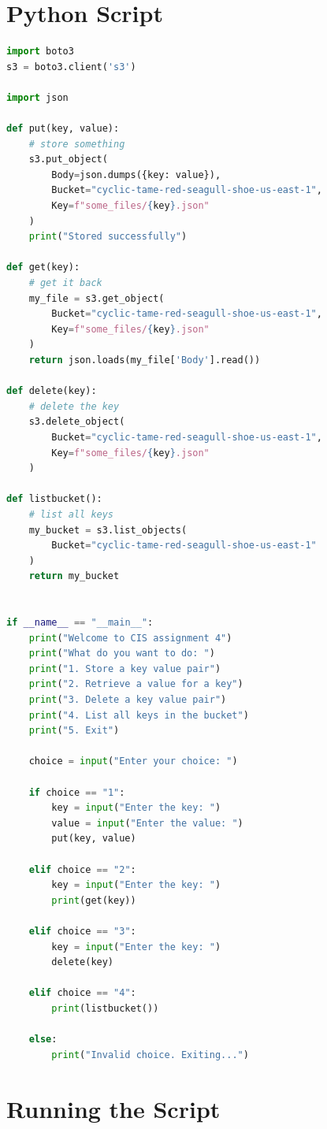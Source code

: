 \documentclass[11pt]{article}
\begin{document}
\section{Python Script}
\begin{lstlisting}[language=python]
import boto3
s3 = boto3.client('s3')

import json

def put(key, value):
    # store something
    s3.put_object(
        Body=json.dumps({key: value}),
        Bucket="cyclic-tame-red-seagull-shoe-us-east-1",
        Key=f"some_files/{key}.json"
    )
    print("Stored successfully")

def get(key):
    # get it back
    my_file = s3.get_object(
        Bucket="cyclic-tame-red-seagull-shoe-us-east-1",
        Key=f"some_files/{key}.json"
    )
    return json.loads(my_file['Body'].read())

def delete(key):
    # delete the key
    s3.delete_object(
        Bucket="cyclic-tame-red-seagull-shoe-us-east-1",
        Key=f"some_files/{key}.json"
    )

def listbucket():
    # list all keys
    my_bucket = s3.list_objects(
        Bucket="cyclic-tame-red-seagull-shoe-us-east-1"
    )
    return my_bucket


if __name__ == "__main__":
    print("Welcome to CIS assignment 4")
    print("What do you want to do: ")
    print("1. Store a key value pair")
    print("2. Retrieve a value for a key")
    print("3. Delete a key value pair")
    print("4. List all keys in the bucket")
    print("5. Exit")

    choice = input("Enter your choice: ")

    if choice == "1":
        key = input("Enter the key: ")
        value = input("Enter the value: ")
        put(key, value)

    elif choice == "2":
        key = input("Enter the key: ")
        print(get(key))

    elif choice == "3":
        key = input("Enter the key: ")
        delete(key)

    elif choice == "4":
        print(listbucket())

    else:
        print("Invalid choice. Exiting...")
\end{lstlisting}

\section{Running the Script}
\end{document}

